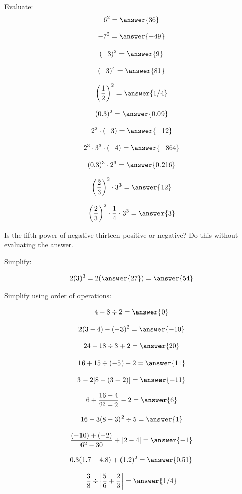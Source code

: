 \documentclass{ximera}
\begin{document}
\begin{problem}
Evaluate:
\[
6^2 = \answer{36}
\]

\[
-7^2 = \answer{-49}
\]

\[
(-3)^2 = \answer{9}
\]

\[
(-3)^4 = \answer{81}
\]

\[
\left( \frac{1}{2} \right)^2 = \answer{1/4}
\]

\[
(0.3)^2 = \answer{0.09}
\]

\[
2^2 \cdot (-3) = \answer{-12}
\]

\[
2^3 \cdot 3^3 \cdot (-4) = \answer{-864}
\]

\[
(0.3)^3 \cdot 2^3 = \answer{0.216}
\]

\[
\left( \frac{2}{3} \right)^2 \cdot 3^3 = \answer{12}
\]

\[
\left( \frac{2}{3}\right)^2 \cdot \frac{1}{4} \cdot 3^3 = \answer{3}
\]
\end{problem}

\begin{problem}
Is the fifth power of negative thirteen positive or negative? Do this without evaluating the answer.
\begin{multipleChoice}
\end{multipleChoice}

\end{problem}

\begin{problem}
Simplify: 

$$ 2(3)^3 = 2(\answer{27}) = \answer{54}$$

\end{problem}

\begin{problem}
Simplify using order of operations:

\[
4 - 8 \div 2 = \answer{0}
\]

\[
2(3-4) - (-3)^2 = \answer{-10}
\]

\[
24 - 18 \div 3 + 2 = \answer{20}
\]

\[
16 + 15 \div (-5) - 2 = \answer{11}
\]

\[
3 - 2[8-(3-2)]= \answer{-11}
\]

\[
6 + \frac{16-4}{2^2+2} - 2 = \answer{6}
\]

\[
16 - 3(8-3)^2 \div 5 = \answer{1}
\]

\[
\frac{(-10)+(-2)}{6^2 - 30} \div \vert 2-4 \vert = \answer{-1}
\]

\[
0.3(1.7-4.8) + (1.2)^2 = \answer{0.51}
\]

\[
\frac{3}{8} \div \left| \frac{5}{6} + \frac{2}{3} \right| = \answer{1/4}
\]





\end{problem}
\end{document}
